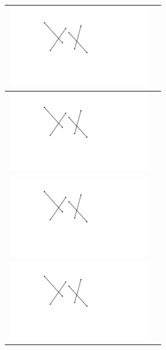 \documentclass[a4paper,12pt]{article}
\begin{document}
\begin{tabular}[!h]{|p{6cm}|p{10cm}|}
\hline
\includegraphics[width=6cm]{../images/linesweep_no_label.pdf} & \\
\hline
\includegraphics[width=6cm]{../images/linesweep_no_label.pdf} & \\
\hline
\includegraphics[width=6cm]{../images/linesweep_no_label.pdf} & \\
\hline
\includegraphics[width=6cm]{../images/linesweep_no_label.pdf} & \\
\hline
\end{tabular}
\end{document}
